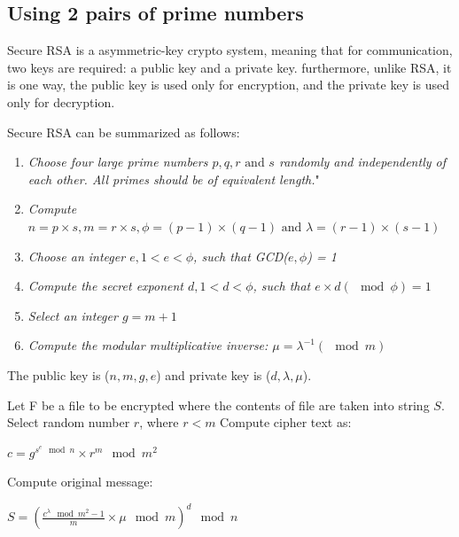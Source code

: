 \documentclass[12pt,journal,compsoc]{IEEEtran}
\begin{document}
\subsection{{Using 2 pairs of prime numbers}}
\label{sec:mrea_algo}

Secure RSA\cite{mrea} is a asymmetric-key crypto system, meaning that for communication, two keys are required: a public key and a private key. furthermore, unlike RSA, it is one way, the public key is used only for encryption, and the private key is used only for decryption.

Secure RSA can be summarized as follows: \\
\begin{enumerate}[ {STEP }1{:} ]
	\item \emph{Choose four large prime numbers $p, q, r \text{ and } s$ randomly and independently of each other. All primes should be of equivalent length.}"
	\item \emph{Compute $n = p \times s, m=r \times s, \phi = (p-1)\times(q-1) \text{ and } \lambda = (r-1) \times (s-1)$}
	\item \emph{Choose an integer $e, 1 < e < \phi$, such that GCD($e, \phi$) = 1}
		\label{itm:step3}
	\item \emph{Compute the secret exponent $d, 1 < d < \phi$, such that $e \times d (\mod \phi) = 1$}
		\label{itm:step6}
	\item \emph{Select an integer $g = m+1$}
	\item \emph{Compute the modular multiplicative inverse: $\mu = \lambda^{-1} (\mod m)$}
\end{enumerate}
The public key is ($n, m, g, e$) and private key is ($d, \lambda, \mu$). 

Let F be a file to be encrypted where the contents of file are taken into string $S$. Select random number $r$, where $r<m$ Compute cipher text as:
\begin{center}
	$c = g^{s^{e}\mod n} \times r^{m}\mod m^{2}$
\end{center}

Compute original message:
\begin{center}
	$S = (\frac{c^{\lambda}\mod m^{2}-1}{m}\times \mu \mod m)^{d} \mod n$
\end{center}
\end{document}
